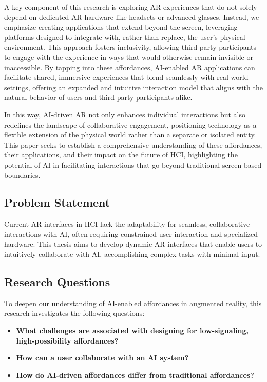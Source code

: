 A key component of this research is exploring AR experiences that do not solely depend on dedicated AR hardware like headsets or advanced glasses.
Instead, we emphasize creating applications that extend beyond the screen, leveraging platforms designed to integrate with, rather than replace, the user’s physical environment.
This approach fosters inclusivity, allowing third-party participants to engage with the experience in ways that would otherwise remain invisible or inaccessible.
By tapping into these affordances, AI-enabled AR applications can facilitate shared, immersive experiences that blend seamlessly with real-world settings, offering an expanded and intuitive interaction model that aligns with the natural behavior of users and third-party participants alike.

In this way, AI-driven AR not only enhances individual interactions but also redefines the landscape of collaborative engagement, positioning technology as a flexible extension of the physical world rather than a separate or isolated entity.
This paper seeks to establish a comprehensive understanding of these affordances, their applications, and their impact on the future of HCI, highlighting the potential of AI in facilitating interactions that go beyond traditional screen-based boundaries.

\subsection{Problem Statement}

Current AR interfaces in HCI lack the adaptability for seamless, collaborative interactions with AI, often requiring constrained user interaction and specialized hardware.
This thesis aims to develop dynamic AR interfaces that enable users to intuitively collaborate with AI, accomplishing complex tasks with minimal input.

\subsection{Research Questions}

To deepen our understanding of AI-enabled affordances in augmented reality, this research investigates the following questions:

\begin{itemize}
    \item \textbf{What challenges are associated with designing for low-signaling, high-possibility affordances?}
    \item \textbf{How can a user collaborate with an AI system?}
    \item \textbf{How do AI-driven affordances differ from traditional affordances?}
\end{itemize}


